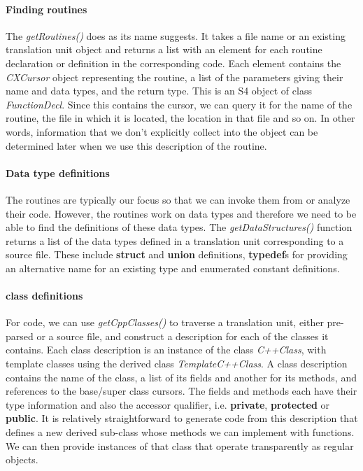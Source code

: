 \documentclass[article]{jss}
\def\Cpp{\proglang{C$++$}}
\def\R{\proglang{R}}
\def\Rfunc#1{\textsl{#1()}}
\def\Rclass#1{\textit{#1}}
\def\Cppkeyword#1{\textbf{#1}}
\def\Ckeyword#1{\textbf{#1}}
\begin{document}
\paragraph{Finding routines}
The \Rfunc{getRoutines} does as its name suggests. It takes a file
name or an existing translation unit object and returns a list with an
element for each routine declaration or definition in the
corresponding code.  Each element contains the \Rclass{CXCursor}
object representing the routine, a list of the parameters giving their
name and data types, and the return type.  This is an S4
object of class \Rclass{FunctionDecl}. Since this contains the cursor,
we can query it for the name of the routine, the file in which it is
located, the location in that file and so on. In other words,
information that we don't explicitly collect into the \R{} object can
be determined later when we use this description of the routine.

\paragraph{Data type definitions}
The routines are typically our focus so that we can invoke them from
\R{} or analyze their code. However, the routines work on data types
and therefore we need to be able to find the definitions of these data
types.  The \Rfunc{getDataStructures} function returns a list of the
data types defined in a translation unit corresponding to a source
file.  These include \Ckeyword{struct} and \Ckeyword{union}
definitions, \Ckeyword{typedef}s for providing an alternative name for
an existing type and enumerated constant definitions.

\paragraph{\Cpp{} class definitions}
For \Cpp{} code, we can use \Rfunc{getCppClasses} to traverse a
translation unit, either pre-parsed or a source file, and construct a
description for each of the \Cpp{} classes it contains. Each class
description is an instance of the class \Rclass{C++Class}, with
template classes using the derived class \Rclass{TemplateC++Class}.  A
class description contains the name of the class, a list of its fields
and another for its methods, and references to the base/super class
cursors.  The fields and methods each have their type information and
also the accessor qualifier, i.e. \Cppkeyword{private},
\Cppkeyword{protected} or \Cppkeyword{public}.  It is relatively
straightforward to generate \Cpp{} code from this description that
defines a new derived sub-class whose methods we can implement with \R{}
functions.  We can then provide \R{} instances of that class that
operate transparently as regular \Cpp{} objects.
\end{document}
